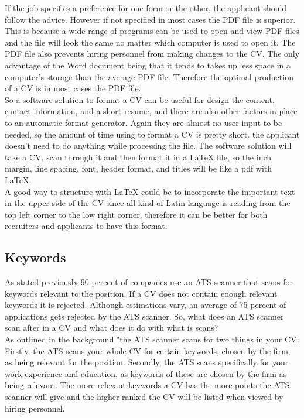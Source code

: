 If the job specifies a preference for one form or the other, the applicant should follow the advice.
However if not specified in most cases the PDF file is superior.
This is because a wide range of programs can be used to open and view PDF files and the file will look the same no matter which computer is used to open it.
The PDF file also prevents hiring personnel from making changes to the CV. 
The only advantage of the Word document being that it tends to takes up less space in a computer's storage than the average PDF file.
Therefore the optimal production of a CV is in most cases the PDF file. \\

So a software solution to format a CV can be useful for design the content, contact information, and a short resume,
and there are also other factors in place to an automatic format generator. Again they are almost no user input to be needed, 
so the amount of time using to format a CV is pretty short. 
the applicant doesn't need to do anything while processing the file. The software solution will take a CV, scan through it and
then format it in a LaTeX file, so the inch margin, line spacing, font, header format, and titles will be like a pdf with LaTeX.\\

A good way to structure with LaTeX could be to incorporate the important text in the upper side of the CV 
since all kind of Latin language is reading from the top left corner to the low right corner, therefore it can be better
for both recruiters and applicants to have this format\cite{Pdf_vs_word}.\\

\subsection{Keywords}
As stated previously 90 percent of companies use an ATS scanner that scans for keywords relevant to the position.
If a CV does not contain enough relevant keywords it is rejected. 
Although estimations vary, an average of 75 percent of applications gets rejected by the ATS scanner.
So, what does an ATS scanner scan after in a CV and what does it do with what is scans? \\

As outlined in the background "the ATS scanner scans for two things in your CV:
Firstly, the ATS scans your whole CV for certain keywords, chosen by the firm, as being relevant for the position.
Secondly, the ATS scans specifically for your work experience and education, 
as keywords of these are chosen by the firm as being relevant. 
The more relevant keywords a CV has the more points the ATS scanner will give and the higher ranked the CV will be listed when viewed by hiring personnel. \\

